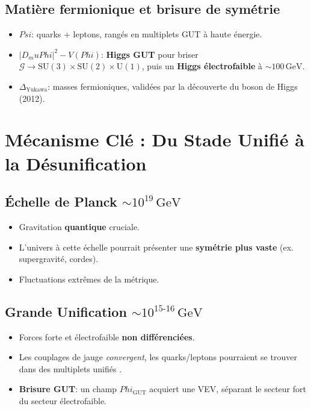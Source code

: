 \documentclass[12pt]{article}
\def\Phi{Phi}%
\def\Psi{Psi}%
\def\mu{mu}%
\begin{document}
\subsection{Mati\`ere fermionique et brisure de sym\'etrie}
\begin{itemize}
    \item \(\Psi\): quarks + leptons, rang\'es en multiplets GUT \`a haute \'energie.  
    \item $|D_\mu \Phi|^2 - V(\Phi)$: \textbf{Higgs GUT} pour briser $\mathcal{G}\to\mathrm{SU}(3)\times\mathrm{SU}(2)\times\mathrm{U}(1)$, 
          puis un \textbf{Higgs \'electrofaible} \`a $\sim100\,\mathrm{GeV}$.  
    \item $\Delta_{\mathrm{Yukawa}}$: masses fermioniques, valid\'ees par la d\'ecouverte du boson de Higgs (2012).
\end{itemize}

\section{M\'ecanisme Cl\'e : Du Stade Unifi\'e \`a la D\'esunification}
\label{sec:univers_evolution}

\subsection{\'Echelle de Planck \(\sim 10^{19}\,\mathrm{GeV}\)}
\begin{itemize}
\item Gravitation \textbf{quantique} cruciale. 
\item L'univers \`a cette \'echelle pourrait pr\'esenter une \textbf{sym\'etrie plus vaste} (ex. supergravité, cordes). 
\item Fluctuations extr\^emes de la m\'etrique.
\end{itemize}

\subsection{Grande Unification \(\sim 10^{15\text{-}16}\,\mathrm{GeV}\)}
\begin{itemize}
\item Forces forte et \'electrofaible \textbf{non diff\'erenci\'ees}. 
\item Les couplages de jauge \emph{convergent}, les quarks/leptons pourraient se trouver dans des multiplets unifi\'es \cite{langacker1981grand, georgi1974unified}. 
\item \textbf{Brisure GUT}: un champ $\Phi_{\mathrm{GUT}}$ acquiert une VEV, s\'eparant le secteur fort du secteur \'electrofaible.
\end{itemize}
\end{document}
